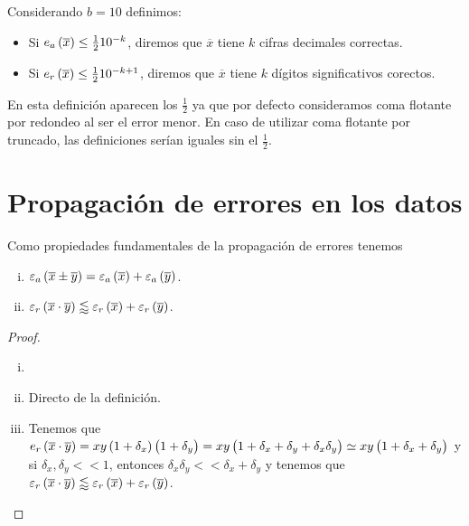 \begin{defi}
    Considerando $b = 10$ definimos:
    \begin{itemize}
	\item Si $e_a\left( \overline{x}\right)  \leq \frac{1}{2}10^{-k}$, diremos que $\overline{x}$ tiene $k$ cifras decimales correctas.
	\item Si $e_r\left( \overline{x}\right)  \leq \frac{1}{2}10^{-k+1}$, diremos que $\overline{x}$ tiene $k$ dígitos significativos corectos.
    \end{itemize}
\end{defi}

\begin{obs}
  En esta definición aparecen los $\frac{1}{2}$ ya que por defecto consideramos coma flotante por redondeo al ser el error menor. En caso de utilizar coma flotante por truncado, las definiciones serían iguales sin el $\frac{1}{2}$.
\end{obs}

\section{Propagación de errores en los datos}

\begin{prop}
  Como propiedades fundamentales de la propagación de errores tenemos
  \begin{enumerate}[i)]
    \item $\varepsilon_a\left( \overline{x} \pm \overline{y}\right)  = \varepsilon_a\left( \overline{x}\right)  + \varepsilon_a\left( \overline{y}\right)$.
    \item $\varepsilon_r\left( \overline{x}\cdot\overline{y}\right)  \lessapprox \varepsilon_r\left( \overline{x}\right)  + \varepsilon_r\left( \overline{y}\right)$.
  \end{enumerate}
\end{prop}
\begin{proof}
  \begin{enumerate}[i)]
   \item []
   \item Directo de la definición.
   \item Tenemos que $e_r\left( \overline{x}\cdot\overline{y}\right)  = xy\left( 1+\delta_x\right) \left( 1+\delta_y\right)  = xy\left( 1 + \delta_x + \delta_y + \delta_x\delta_y\right)  \simeq xy\left( 1 + \delta_x + \delta_y\right)$ y si $\delta_x,\delta_y << 1$, entonces $\delta_x\delta_y << \delta_x + \delta_y$ y tenemos que $\varepsilon_r\left( \overline{x}\cdot\overline{y}\right)  \lessapprox \varepsilon_r\left( \overline{x}\right)  + \varepsilon_r\left( \overline{y}\right)$.
  \end{enumerate}
\end{proof}

